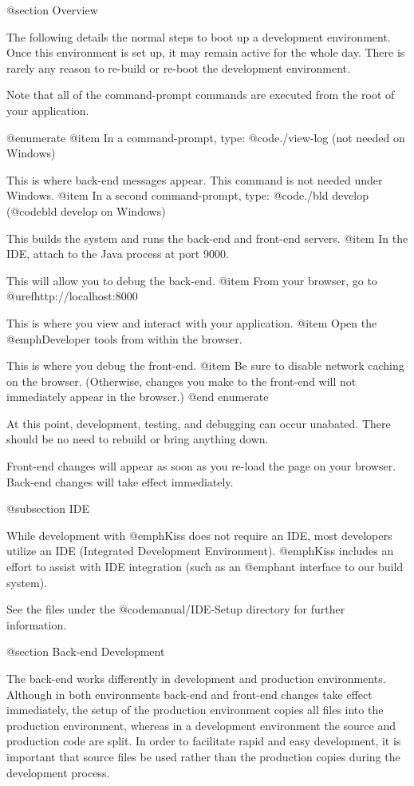 @section Overview

The following details the normal steps to boot up a development environment.
Once this environment is set up, it may remain active for the whole day.
There is rarely any reason to re-build or re-boot the development environment.

Note that all of the command-prompt commands are executed from the
root of your application.

@enumerate
@item
In a command-prompt, type:  @code{./view-log} (not needed on Windows)

This is where back-end messages appear. This command is not needed under Windows.
@item
In a second command-prompt, type:  @code{./bld develop} (@code{bld develop} on Windows)

This builds the system and runs the back-end and front-end servers.
@item
In the IDE, attach to the Java process at port 9000.

This will allow you to debug the back-end.
@item
From your browser, go to @uref{http://localhost:8000}

This is where you view and interact with your application.
@item
Open the @emph{Developer tools} from within the browser.

This is where you debug the front-end.
@item
Be sure to disable network caching on the browser. (Otherwise, changes you make to
the front-end will not immediately appear in the browser.)
@end enumerate

At this point, development, testing, and debugging can occur unabated.
There should be no need to rebuild or bring anything down.

Front-end changes will appear as soon as you re-load the page on your browser.
Back-end changes will take effect immediately.

@subsection IDE

While development with @emph{Kiss} does not require an IDE, most
developers utilize an IDE (Integrated Development Environment).  
@emph{Kiss} includes an effort to assist with IDE integration
(such as an @emph{ant} interface to our build system).

See the files under the @code{manual/IDE-Setup} directory for further
information.

@section Back-end Development

The back-end works differently in development and production
environments.  Although in both environments back-end and front-end
changes take effect immediately, the setup of the production environment
copies all files into the production environment, whereas in a
development environment the source and production code are split.  In
order to facilitate rapid and easy development, it is important that
source files be used rather than the production copies during the
development process.  

